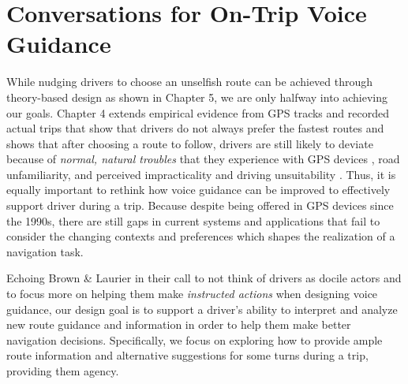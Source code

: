 \chapter{Conversations for On-Trip Voice Guidance}
While nudging drivers to choose an unselfish route can be achieved through theory-based design as shown in Chapter 5, we are only halfway into achieving our goals. Chapter 4 extends empirical evidence from GPS tracks and recorded actual trips that show that drivers do not always prefer the fastest routes \cite{Quercia2014, Zhu2015DoPrinciple,Tang2016AnalyzingData,Fujino2018DetectingTracks,Brown2012TheGPS,Samson:2019:EFI:3290605.3300601} and shows that after choosing a route to follow, drivers are still likely to deviate because of \emph{normal, natural troubles} that they experience with GPS devices \cite{Brown2012TheGPS}, road unfamiliarity, and perceived impracticality and driving unsuitability \cite{Samson:2019:EFI:3290605.3300601}. Thus, it is equally important to rethink how voice guidance can be improved to effectively support driver during a trip. Because despite being offered in GPS devices since the 1990s, there are still gaps in current systems and applications that fail to consider the changing contexts and preferences which shapes the realization of a navigation task. 

Echoing Brown \& Laurier \cite{Brown2012TheGPS} in their call to not think of drivers as docile actors and to focus more on helping them make \textit{instructed actions} when designing voice guidance, our design goal is to support a driver's ability to interpret and analyze new route guidance and information in order to help them make better navigation decisions. Specifically, we focus on exploring how to provide ample route information and alternative suggestions for some turns during a trip, providing them agency.

